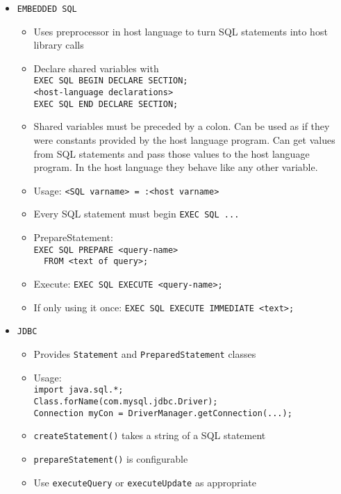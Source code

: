 \documentclass[landscape,8pt]{extarticle}
\newcommand{\code}{\lstinline}
\begin{document}
\begin{multicols}{4}
\begin{itemize}
\begin{itemize}
\begin{itemize}
        \end{itemize}
    \end{itemize}
    \item \code{EMBEDDED SQL}
    \begin{itemize}
        \item Uses preprocessor in host language to turn SQL statements into host library calls
        \item Declare shared variables with \\
\code{EXEC SQL BEGIN DECLARE SECTION;}\\
\code{<host-language declarations>}\\
\code{EXEC SQL END DECLARE SECTION;}
        \item Shared variables must be preceded by a colon. Can be used as if they were constants
        provided by the host language program. Can get values from SQL statements and pass those
        values to the host language program. In the host language they behave like any other
        variable.
        \item Usage: \code{<SQL varname> = :<host varname>}
        \item Every SQL statement must begin \code{EXEC SQL ...}
        \item PrepareStatement:\\
\code{EXEC SQL PREPARE <query-name>}\\
\code{  FROM <text of query>;}
        \item Execute: \code{EXEC SQL EXECUTE <query-name>;}
        \item If only using it once:
\code{EXEC SQL EXECUTE IMMEDIATE <text>;}
        \end{itemize}
        \item \code{JDBC}
    \begin{itemize}
        \item Provides \code{Statement} and \code{PreparedStatement} classes
        \item Usage:\\
\code{import java.sql.*;}\\
\code{Class.forName(com.mysql.jdbc.Driver);}\\
\code{Connection myCon = DriverManager.getConnection(...);}
        \item \code{createStatement()} takes a string of a SQL statement
        \item \code{prepareStatement()} is configurable
        \item Use \code{executeQuery} or \code{executeUpdate} as appropriate

\end{itemize}
\end{itemize}
\end{multicols}
\end{document}
